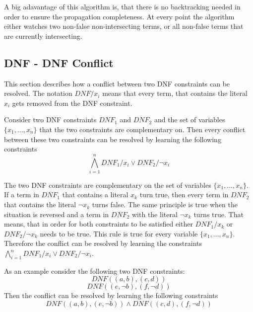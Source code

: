 A big adavantage of this algorithm is, that there is no backtracking needed in order to ensure the propagation completeness. At every point the algorithm either watches two non-false non-intersecting terms, or all non-false terms that are currently intersecting.



\subsection{DNF - DNF Conflict}

This section describes how a conflict between two DNF constraints can be resolved. The notation $DNF/x_i$ means that every term, that contains the literal $x_i$ gets removed from the DNF constraint.
\begin{leftbar}
Consider two DNF constraints $DNF_1$ and $DNF_2$ and the set of variables $\{x_1,...,x_n\}$ that the two constraints are complementary on. Then every conflict between these two constraints can be resolved by learning the following constraints
\begin{displaymath}
\bigwedge_{i=1}^{n} DNF_1 / x_i \vee DNF_2 / \neg x_i
\end{displaymath}
\end{leftbar}
The two DNF constraints are complementary on the set of variables $\{x_1,...,x_n\}$. If a term in $DNF_1$ that contains a literal $x_k$ turn true, then every term in $DNF_2$ that contains the literal $\neg x_k$ turns false. The same principle is true when the situation is reversed and a term in $DNF_2$ with the literal $\neg x_k$ turns true. That means, that in order for both constraints to be satisfied either $DNF_1/x_k$ or $DNF_2/\neg x_k$ needs to be true. This rule is true for every variable $\{x_1,...,x_n\}$. Therefore the conflict can be resolved by learning the constraints $\bigwedge_{i=1}^{n} DNF_1 / x_i \vee DNF_2 / \neg x_i$.

As an example consider the following two DNF constraints:
\begin{displaymath}
DNF ((a,b),(c,d))
\end{displaymath}
\begin{displaymath}
DNF ((e,\neg b),(f,\neg d))
\end{displaymath}
Then the conflict can be resolved by learning the following constraints
\begin{displaymath}
DNF ((a,b),(e,\neg b)) \wedge DNF ((c,d),(f,\neg d))
\end{displaymath}

